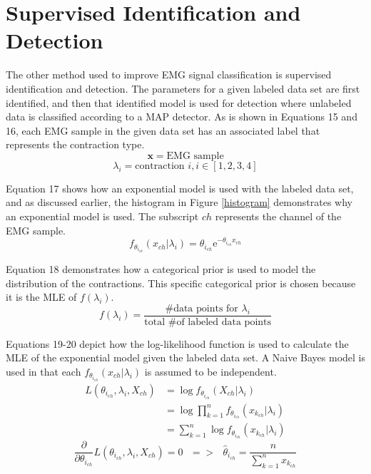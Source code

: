 \documentclass[times, 10pt,twocolumn]{article}
\begin{document}
\section{Supervised Identification and Detection}

The other method used to improve EMG signal classification is supervised identification and detection. The parameters for a given labeled data set are first identified, and then that identified model is used for detection where unlabeled data is classified according to a MAP detector. As is shown in Equations 15 and 16, each EMG sample in the given data set has an associated label that represents the contraction type.
\begin{equation}
\mathbf{x} = \text{EMG sample}
\end{equation}
\begin{equation}
\lambda_i = \text{contraction }i, i\in[1,2,3,4]
\end{equation}

Equation 17 shows how an exponential model is used with the labeled data set, and as discussed earlier, the histogram in Figure \ref{histogram} demonstrates why an exponential model is used. The subscript $ch$ represents the channel of the EMG sample.
\begin{equation}
f_{\theta_{i_{ch}}}(x_{ch}|\lambda_i) = \theta_{i_{ch}}\mathrm{e}^{-\theta_{i_{ch}}x_{ch}}
\end{equation}

Equation 18 demonstrates how a categorical prior is used to model the distribution of the contractions. This specific categorical prior is chosen because it is the MLE of $f(\lambda_i)$.
\begin{equation}
f(\lambda_i) = \frac{\text{\# data points for }\lambda_i}{\text{total \# of labeled data points}}
\end{equation}

Equations 19-20 depict how the log-likelihood function is used to calculate the MLE of the exponential model given the labeled data set. A Naive Bayes model is used in that each $f_{\theta_{i_{ch}}}(x_{ch}|\lambda_i)$ is assumed to be independent.
\begin{equation}
\begin{split}
L(\theta_{i_{ch}},\lambda_i,X_{ch}) & = \log{f_{\theta_{i_{ch}}}(X_{ch}|\lambda_i)} \\
& = \log{\prod_{k=1}^{n}f_{\theta_{i_{ch}}}(x_{k_{ch}}|\lambda_i)} \\
& = \sum_{k=1}^{n}\log{f_{\theta_{i_{ch}}}(x_{k_{ch}}|\lambda_i)}
\end{split}
\end{equation}
\begin{equation}
\frac{\partial}{\partial{\theta_{i_{ch}}}}L(\theta_{i_{ch}},\lambda_i,X_{ch}) = 0 \text{ } => \text{ } \hat{\theta}_{i_{ch}} = \frac{n}{\sum_{k=1}^{n}x_{k_{ch}}}
\end{equation}
\end{document}
